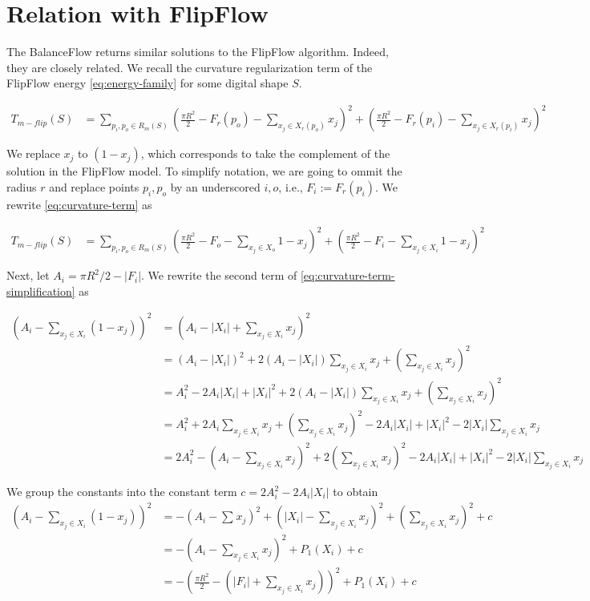 \section{Relation with FlipFlow}
	The BalanceFlow returns similar solutions to the FlipFlow algorithm. Indeed, they are closely related. We recall the curvature regularization term of the FlipFlow energy \eqref{eq:energy-family} for some digital shape $S$. 

\begin{align}
T_{m-flip}(S) &= \sum_{ p_i,p_o \in R_m(S)}{ ( \frac{\pi R^2}{2} - F_r(p_o) - \sum_{x_j \in X_r(p_o)}{x_j})^2 + (\frac{\pi R^2}{2} - F_r(p_i) - \sum_{x_j \in X_r(p_i)}{x_j})^2 }
\label{eq:curvature-term}
\end{align}

We replace $x_j$ to $(1-x_j)$, which corresponds to take the complement of the solution in the FlipFlow model. To simplify notation, we are going to ommit the radius $r$ and replace points $p_i,p_o$ by an underscored $i,o$, i.e., $F_i := F_r(p_i)$. We rewrite \eqref{eq:curvature-term} as

\begin{align}
T_{m-flip}(S) &= \sum_{ p_i,p_o \in R_m(S)}{ ( \frac{\pi R^2}{2} - F_o - \sum_{x_j \in X_o}{1-x_j})^2 + (\frac{\pi R^2}{2} - F_i - \sum_{x_j \in X_i}{1-x_j})^2 }
\label{eq:curvature-term-simplification}
\end{align}

Next, let $A_i = \pi R^2/2 - |F_i|$. We rewrite  the second term of \eqref{eq:curvature-term-simplification} as

\begin{align*}
	(A_i - \sum_{x_j \in X_i}{ (1-x_j) })^2 &= (A_i - |X_i| + \sum_{x_j \in X_i}{ x_j })^2 \\
	&= (A_i - |X_i|)^2 + 2(A_i - |X_i|)\sum_{x_j \in X_i}{x_j} + ( \sum_{x_j \in X_i}{x_j} )^2\\	
	&= A_i^2 -2A_i|X_i| + |X_i|^2 + 2(A_i - |X_i|)\sum_{x_j \in X_i}{x_j} + ( \sum_{x_j \in X_i}{x_j} )^2\\
	&= A_i^2 + 2A_i\sum_{x_j \in X_i}{x_j} + ( \sum_{x_j \in X_i}{x_j} )^2 - 2A_i|X_i| + |X_i|^2 -2|X_i|\sum_{x_j \in X_i}{x_j} \\
	&= 2A_i^2 - (A_i - \sum_{x_j \in X_i}{x_j})^2 + 2( \sum_{x_j \in X_i}{x_j} ) ^2 - 2A_i|X_i| + |X_i|^2 - 2|X_i|\sum_{x_j \in X_i}{x_j}
\end{align*}

	We group the constants into the constant term $c=2A_i^2 - 2A_i|X_i|$	 to obtain
\begin{align}
		(A_i - \sum_{x_j \in X_i}{ (1-x_j) })^2 &= - (A_i - \sum_{}{x_j})^2 + (|X_i| - \sum_{x_j \in X_i}{x_j})^2 + (\sum_{x_j \in X_i}{x_j})^2 + c \nonumber \\
	&= - (A_i - \sum_{x_j \in X_i}{x_j})^2 + P_1(X_i) + c \nonumber \\
	&= - (\frac{\pi R^2}{2} - (|F_i| + \sum_{x_j \in X_i}{x_j}) )^2 + P_1(X_i) + c \nonumber 	
	\label{eq:second-term}
\end{align}


